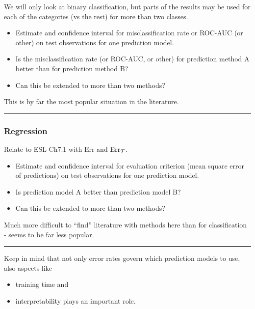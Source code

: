 \documentclass[
  letterpaper,
  DIV=11,
  numbers=noendperiod]{scrartcl}
\providecommand{\tightlist}{%
  \setlength{\itemsep}{0pt}\setlength{\parskip}{0pt}}\usepackage{longtable,booktabs,array}
\begin{document}
We will only look at binary classification, but parts of the results may
be used for each of the categories (vs the rest) for more than two
classes.

\begin{itemize}
\tightlist
\item
  Estimate and confidence interval for misclassification rate or ROC-AUC
  (or other) on test observations for one prediction model.
\item
  Is the misclassification rate (or ROC-AUC, or other) for prediction
  method A better than for prediction method B?
\item
  Can this be extended to more than two methods?
\end{itemize}

This is by far the most popular situation in the literature.

\begin{center}\rule{0.5\linewidth}{0.5pt}\end{center}

\hypertarget{regression}{%
\subsubsection{Regression}\label{regression}}

Relate to ESL Ch7.1 with \(\text{Err}\) and \(\text{Err}_{\cal T}\).

\begin{itemize}
\tightlist
\item
  Estimate and confidence interval for evaluation criterion (mean square
  error of predictions) on test observations for one prediction model.
\item
  Is prediction model A better than prediction model B?
\item
  Can this be extended to more than two methods?
\end{itemize}

Much more difficult to ``find'' literature with methods here than for
classification - seems to be far less popular.

\begin{center}\rule{0.5\linewidth}{0.5pt}\end{center}

Keep in mind that not only error rates govern which prediction models to
use, also aspects like

\begin{itemize}
\tightlist
\item
  training time and
\item
  interpretability plays an important role.
\end{itemize}
\end{document}
